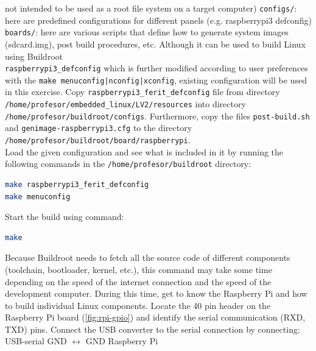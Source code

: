 \documentclass[11pt]{article}
\begin{document}
 not intended to be used as a root file system on a target computer)
\newline
\newline
\texttt{configs/}: here are predefined configurations for different panels
 (e.g. raspberrypi3 defconfig)
\newline
\newline
\texttt{boards/}: here are various scripts that define how to generate system
 images (sdcard.img), post build procedures, etc.
\newline
\newline
Although it can be used to build Linux using Buildroot \\
 \texttt{raspberrypi3\_defconfig} which is further modified according to user
 preferences with the \texttt{make menuconfig|nconfig|xconfig}, existing
 configuration will be used in this exercise. Copy
 \texttt{raspberrypi3\_ferit\_defconfig} file from directory
 \texttt{/home/profesor/embedded\_linux/LV2/resources} into directory
 \texttt{/home/profesor/buildroot/configs}. Furthermore, copy the files
 \texttt{post-build.sh} and \texttt{genimage-raspberrypi3.cfg} to the
 directory \texttt{/home/profesor/buildroot/board/raspberrypi}.\\
\newline
Load the given configuration and see what is included in it by running the
 following commands in the \texttt{/home/profesor/buildroot} directory:
\begin{lstlisting}[language=bash]
make raspberrypi3_ferit_defconfig
make menuconfig
\end{lstlisting}
Start the build using command:
\begin{lstlisting}[language=bash]
make
\end{lstlisting}
Because Buildroot needs to fetch all the source code of different components
 (toolchain, bootloader, kernel, etc.), this command may take some time
 depending on the speed of the internet connection and the speed of the
 development computer. During this time, get to know the Raspberry Pi and
 how to build individual Linux components.
\newline
\newline
Locate the 40 pin header on the Raspberry Pi board (\ref{fig:rpi-gpio}) and
 identify the serial communication (RXD, TXD) pins. Connect the USB converter
 to the serial connection by connecting:\\
\newline
USB-serial GND $\leftrightarrow$ GND Raspberry Pi \\
\end{document}

